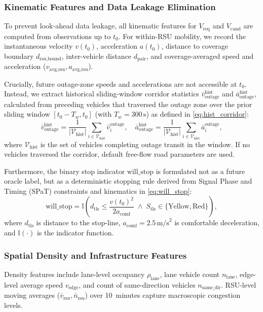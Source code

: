 \documentclass[journal]{IEEEtran}
\begin{document}
\subsubsection{Kinematic Features and Data Leakage Elimination}
To prevent look-ahead data leakage, all kinematic features for $V_{\text{req}}$ and $V_{\text{cand}}$ are computed from observations up to $t_0$. For within-RSU mobility, we record the instantaneous velocity $v(t_0)$, acceleration $a(t_0)$, distance to coverage boundary $d_{\text{rsu,bound}}$, inter-vehicle distance $d_{\text{pair}}$, and coverage-averaged speed and acceleration ($v_{\text{avg,rsu}}, a_{\text{avg,rsu}}$). 

Crucially, future outage-zone speeds and accelerations are not accessible at $t_0$. Instead, we extract historical sliding-window corridor statistics $\bar{v}_{\text{outage}}^{\text{hist}}$ and $\bar{a}_{\text{outage}}^{\text{hist}}$, calculated from preceding vehicles that traversed the outage zone over the prior sliding window $[t_0 - T_w, t_0]$ (with $T_w = 300\,\text{s}$) as defined in \eqref{eq:hist_corridor}:
\begin{equation}
\bar{v}_{\text{outage}}^{\text{hist}} = \frac{1}{|\mathcal{V}_{\text{hist}}|} \sum_{i \in \mathcal{V}_{\text{hist}}} \bar{v}_i^{\text{outage}}, \quad \bar{a}_{\text{outage}}^{\text{hist}} = \frac{1}{|\mathcal{V}_{\text{hist}}|} \sum_{i \in \mathcal{V}_{\text{hist}}} \bar{a}_i^{\text{outage}},
\label{eq:hist_corridor}
\end{equation}
where $\mathcal{V}_{\text{hist}}$ is the set of vehicles completing outage transit in the window. If no vehicles traversed the corridor, default free-flow road parameters are used.

Furthermore, the binary stop indicator $\text{will\_stop}$ is formulated not as a future oracle label, but as a deterministic stopping rule derived from Signal Phase and Timing (SPaT) constraints and kinematics in \eqref{eq:will_stop}:
\begin{equation}
\text{will\_stop} = \mathbb{I}\left( d_{\text{tls}} \le \frac{v(t_0)^2}{2 a_{\text{comf}}} \;\land\; S_{\text{tls}} \in \{\text{Yellow}, \text{Red}\} \right),
\label{eq:will_stop}
\end{equation}
where $d_{\text{tls}}$ is distance to the stop-line, $a_{\text{comf}} = 2.5\,\text{m/s}^2$ is comfortable deceleration, and $\mathbb{I}(\cdot)$ is the indicator function.

\subsubsection{Spatial Density and Infrastructure Features}
Density features include lane-level occupancy $\rho_{\text{lane}}$, lane vehicle count $n_{\text{lane}}$, edge-level average speed $v_{\text{edge}}$, and count of same-direction vehicles $n_{\text{same\_dir}}$. RSU-level moving averages ($\bar{v}_{\text{rsu}}, \bar{n}_{\text{rsu}}$) over 10~minutes capture macroscopic congestion levels.
\end{document}
